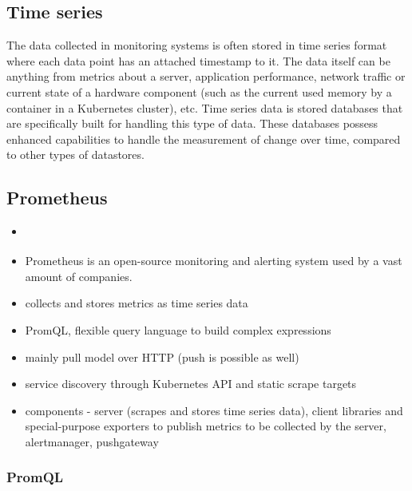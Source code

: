 \subsection{Time series}

The data collected in monitoring systems is often stored in time series format where each data point has an attached timestamp to it. The data itself can be anything from metrics about a server, application performance, network traffic or current state of a hardware component (such as the current used memory by a container in a Kubernetes cluster), etc. Time series data is stored databases that are specifically built for handling this type of data. These databases possess enhanced capabilities to handle the measurement of change over time, compared to other types of datastores. \cite{TimeSeriesInflux}

\subsection{Prometheus}

\begin{itemize}
	\item \cite{Prometheus}
	\item Prometheus is an open-source monitoring and alerting system used by a vast amount of companies.
	\item collects and stores metrics as time series data
	\item PromQL, flexible query language to build complex expressions
	\item mainly pull model over HTTP (push is possible as well)
	\item service discovery through \eg Kubernetes API and static scrape targets
	\item components - server (scrapes and stores time series data), client libraries and special-purpose exporters to publish metrics to be collected by the server, alertmanager, pushgateway
\end{itemize}

\subsubsection{PromQL} \label{background-promql}


